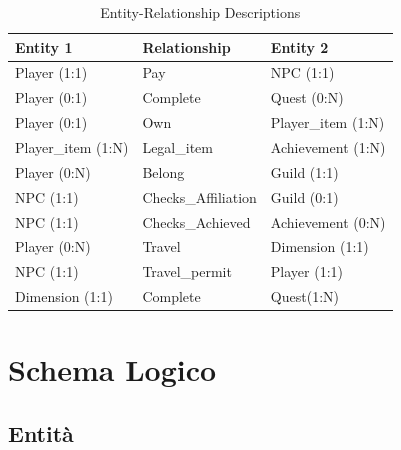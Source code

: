 \documentclass{article}
\begin{document}
\begin{table}[h!]
    \centering
    \begin{tabular}{ | l | l | l | }
        \hline
        \textbf{Entity 1} & \textbf{Relationship} & \textbf{Entity 2} \\
        \hline
        Player (1:1) & Pay & NPC (1:1) \\
        \hline
        Player (0:1) & Complete & Quest (0:N) \\
        \hline
        Player (0:1) & Own & Player\_item (1:N) \\
        \hline
         Player\_item (1:N) & Legal\_item & Achievement (1:N) \\
        \hline
        Player (0:N) & Belong & Guild (1:1) \\
        \hline
        NPC (1:1) & Checks\_Affiliation & Guild (0:1) \\
        \hline
        NPC (1:1) & Checks\_Achieved & Achievement (0:N) \\
        \hline
        Player (0:N) & Travel & Dimension (1:1) \\
        \hline
        NPC (1:1) & Travel\_permit & Player (1:1) \\
        \hline
        Dimension (1:1) & Complete & Quest(1:N) \\
        \hline
    \end{tabular}
    \caption{Entity-Relationship Descriptions}
    \label{tab:er_descriptions}
\end{table}

\section{Schema Logico}


\subsection{Entità}
\end{document}
